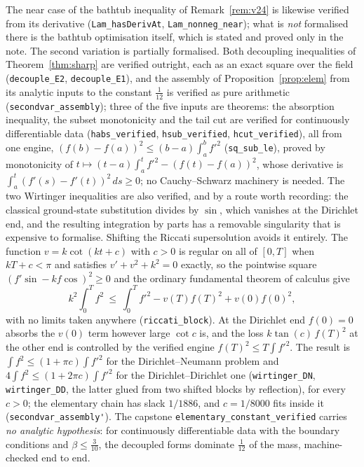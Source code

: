 \documentclass[11pt]{article}
\theoremstyle{definition}
\begin{document}
The near case of the bathtub inequality of Remark~\ref{rem:v24} is likewise
verified from its derivative (\verb|Lam_hasDerivAt|, \verb|Lam_nonneg_near|); what is
\emph{not} formalised there is the bathtub optimisation itself, which is stated and proved
only in the note. The second variation is partially formalised. Both decoupling inequalities of
Theorem~\ref{thm:sharp} are verified outright, each as an exact square over the field
(\verb|decouple_E2|, \verb|decouple_E1|), and the assembly of
Proposition~\ref{prop:elem} from its analytic inputs to the constant $\tfrac1{12}$ is
verified as pure arithmetic (\verb|secondvar_assembly|); three of the five inputs are theorems: the absorption
inequality, the subset monotonicity and the tail cut are verified for continuously
differentiable data (\verb|habs_verified|, \verb|hsub_verified|, \verb|hcut_verified|),
all from one engine, $(f(b)-f(a))^2\le(b-a)\int_a^bf'^2$ (\verb|sq_sub_le|), proved by
monotonicity of $t\mapsto(t-a)\int_a^tf'^2-(f(t)-f(a))^2$, whose derivative is
$\int_a^t(f'(s)-f'(t))^2\,ds\ge0$; no Cauchy--Schwarz machinery is needed. The two Wirtinger
inequalities are also verified, and by a route worth recording: the classical
ground-state substitution divides by $\sin$, which vanishes at the Dirichlet end, and the
resulting integration by parts has a removable singularity that is expensive to
formalise. Shifting the Riccati supersolution avoids it entirely. The function
$v=k\cot(kt+c)$ with $c>0$ is regular on all of $[0,T]$ when $kT+c<\pi$ and satisfies
$v'+v^2+k^2=0$ exactly, so the pointwise square $(f'\sin-k f\cos)^2\ge0$ and the ordinary
fundamental theorem of calculus give
\[
  k^2\int_0^Tf^2\ \le\ \int_0^Tf'^2-v(T)f(T)^2+v(0)f(0)^2 ,
\]
with no limits taken anywhere (\verb|riccati_block|). At the Dirichlet end $f(0)=0$
absorbs the $v(0)$ term however large $\cot c$ is, and the loss $k\tan(c)\,f(T)^2$ at the
other end is controlled by the verified engine $f(T)^2\le T\int f'^2$. The result is
$\int f^2\le(1+\pi c)\int f'^2$ for the Dirichlet--Neumann problem and
$4\int f^2\le(1+2\pi c)\int f'^2$ for the Dirichlet--Dirichlet one
(\verb|wirtinger_DN|, \verb|wirtinger_DD|, the latter glued from two shifted blocks by
reflection), for every $c>0$; the elementary chain has slack $1/1886$, and $c=1/8000$
fits inside it (\verb|secondvar_assembly'|). The capstone
\verb|elementary_constant_verified| carries \emph{no analytic hypothesis}: for
continuously differentiable data with the boundary conditions and $\beta\le\tfrac3{10}$,
the decoupled forms dominate $\tfrac1{12}$ of the mass, machine-checked end to end.
\end{document}
